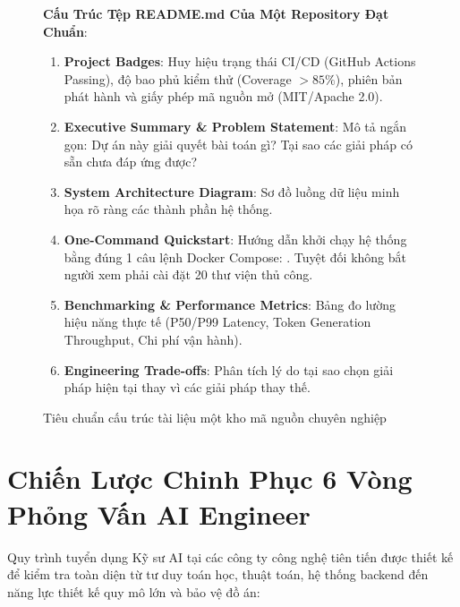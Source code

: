 \begin{figure}[htbp]
\centering
\begin{tcolorbox}[colback=boxbg,colframe=primarycolor,width=0.95\textwidth,arc=2pt]
\small
\textbf{Cấu Trúc Tệp README.md Của Một Repository Đạt Chuẩn}:
\begin{enumerate}
  \item \textbf{Project Badges}: Huy hiệu trạng thái CI/CD (GitHub Actions Passing), độ bao phủ kiểm thử (Coverage $> 85\%$), phiên bản phát hành và giấy phép mã nguồn mở (MIT/Apache 2.0).
  \item \textbf{Executive Summary \& Problem Statement}: Mô tả ngắn gọn: Dự án này giải quyết bài toán gì? Tại sao các giải pháp có sẵn chưa đáp ứng được?
  \item \textbf{System Architecture Diagram}: Sơ đồ luồng dữ liệu minh họa rõ ràng các thành phần hệ thống.
  \item \textbf{One-Command Quickstart}: Hướng dẫn khởi chạy hệ thống bằng đúng 1 câu lệnh Docker Compose: . Tuyệt đối không bắt người xem phải cài đặt 20 thư viện thủ công.
  \item \textbf{Benchmarking \& Performance Metrics}: Bảng đo lường hiệu năng thực tế (P50/P99 Latency, Token Generation Throughput, Chi phí vận hành).
  \item \textbf{Engineering Trade-offs}: Phân tích lý do tại sao chọn giải pháp hiện tại thay vì các giải pháp thay thế.
\end{enumerate}
\end{tcolorbox}
\caption{Tiêu chuẩn cấu trúc tài liệu một kho mã nguồn chuyên nghiệp}
\label{fig:career-github-readme}
\end{figure}

\section{Chiến Lược Chinh Phục 6 Vòng Phỏng Vấn AI Engineer}
\label{sec:career-interviews}

Quy trình tuyển dụng Kỹ sư AI tại các công ty công nghệ tiên tiến được thiết kế để kiểm tra toàn diện từ tư duy toán học, thuật toán, hệ thống backend đến năng lực thiết kế quy mô lớn và bảo vệ đồ án:


